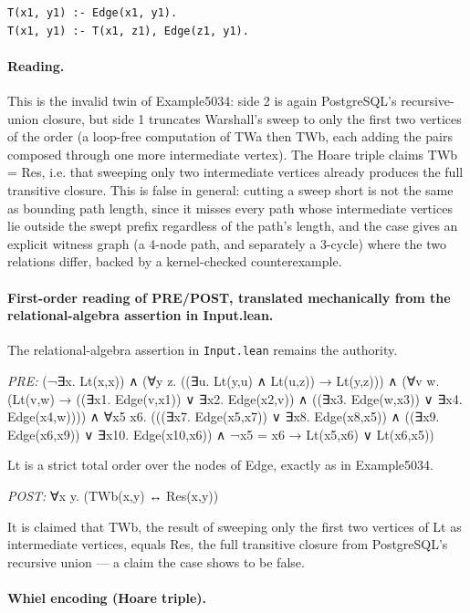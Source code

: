 \documentclass[10pt]{article}
\begin{document}
\begin{Verbatim}[fontsize=\scriptsize,breaklines=true,breakanywhere=true,frame=single,framesep=1.5mm]
T(x1, y1) :- Edge(x1, y1).
T(x1, y1) :- T(x1, z1), Edge(z1, y1).
\end{Verbatim}

\paragraph{Reading.} This is the invalid twin of Example5034: side 2 is again PostgreSQL's recursive-union closure, but side 1 truncates Warshall's sweep to only the first two vertices of the order (a loop-free computation of TWa then TWb, each adding the pairs composed through one more intermediate vertex). The Hoare triple claims TWb = Res, i.e. that sweeping only two intermediate vertices already produces the full transitive closure. This is false in general: cutting a sweep short is not the same as bounding path length, since it misses every path whose intermediate vertices lie outside the swept prefix regardless of the path's length, and the case gives an explicit witness graph (a 4-node path, and separately a 3-cycle) where the two relations differ, backed by a kernel-checked counterexample.

\paragraph{First-order reading of PRE/POST, translated mechanically from the relational-algebra assertion in Input.lean.} The relational-algebra assertion in \texttt{Input.lean} remains the authority.

\textit{PRE:} (¬∃x. Lt(x,x)) ∧ (∀y z. ((∃u. Lt(y,u) ∧ Lt(u,z)) → Lt(y,z))) ∧ (∀v w. (Lt(v,w) → ((∃x1. Edge(v,x1)) ∨ ∃x2. Edge(x2,v)) ∧ ((∃x3. Edge(w,x3)) ∨ ∃x4. Edge(x4,w)))) ∧ ∀x5 x6. (((∃x7. Edge(x5,x7)) ∨ ∃x8. Edge(x8,x5)) ∧ ((∃x9. Edge(x6,x9)) ∨ ∃x10. Edge(x10,x6)) ∧ ¬x5 = x6 → Lt(x5,x6) ∨ Lt(x6,x5))\par Lt is a strict total order over the nodes of Edge, exactly as in Example5034.

\textit{POST:} ∀x y. (TWb(x,y) ↔ Res(x,y))\par It is claimed that TWb, the result of sweeping only the first two vertices of Lt as intermediate vertices, equals Res, the full transitive closure from PostgreSQL's recursive union --- a claim the case shows to be false.

\paragraph{Whiel encoding (Hoare triple).}
\end{document}
